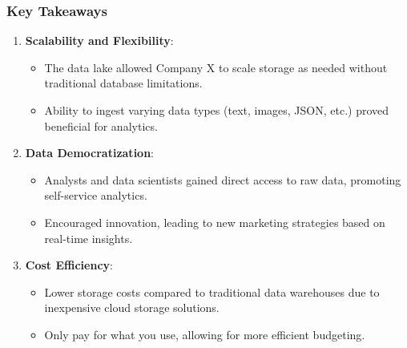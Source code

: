 \documentclass[aspectratio=169]{beamer}
\begin{document}
\begin{frame}[fragile]
    \frametitle{Key Takeaways}
    \begin{enumerate}
        \item \textbf{Scalability and Flexibility}:
        \begin{itemize}
            \item The data lake allowed Company X to scale storage as needed without traditional database limitations.
            \item Ability to ingest varying data types (text, images, JSON, etc.) proved beneficial for analytics.
        \end{itemize}
        
        \item \textbf{Data Democratization}:
        \begin{itemize}
            \item Analysts and data scientists gained direct access to raw data, promoting self-service analytics.
            \item Encouraged innovation, leading to new marketing strategies based on real-time insights.
        \end{itemize}
        
        \item \textbf{Cost Efficiency}:
        \begin{itemize}
            \item Lower storage costs compared to traditional data warehouses due to inexpensive cloud storage solutions.
            \item Only pay for what you use, allowing for more efficient budgeting.
        \end{itemize}
    \end{enumerate}
\end{frame}
\end{document}
